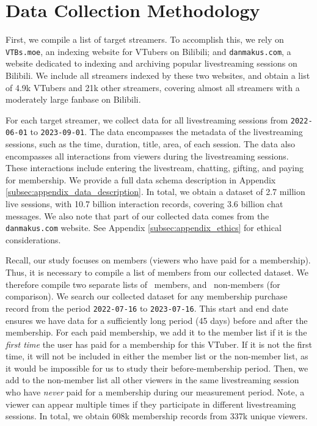 \vspace{-2ex}
\section{Data Collection Methodology}
\label{sec:dataset}



First, we compile a list of target streamers. 
To accomplish this, we rely on \texttt{VTBs.moe}, an indexing website for VTubers on Bilibili; and \texttt{danmakus.com}, a website dedicated to indexing and archiving popular livestreaming sessions on Bilibili.
We include all streamers indexed by these two websites, and obtain a list of 4.9k VTubers and 21k other streamers, covering almost all streamers with a moderately large fanbase on Bilibili. 


For each target streamer, we collect data for all livestreaming sessions from \texttt{2022-06-01} to \texttt{2023-09-01}. The data encompasses the metadata of the livestreaming sessions, such as the time, duration, title, area, \etc of each session.  The data also encompasses all interactions from viewers during the livestreaming sessions. These interactions include entering the livestream, chatting, gifting, and paying for membership. We provide a full data schema description in Appendix \ref{subsec:appendix_data_description}.
In total, we obtain a dataset of 2.7 million live sessions, with 10.7 billion interaction records, covering 3.6 billion chat messages. We also note that part of our collected data comes from the \texttt{danmakus.com} website.
See Appendix \ref{subsec:appendix_ethics} for ethical considerations.

\label{subsec:construct_dataset}
Recall, our study focuses on members (\ie viewers who have paid for a membership). 
Thus, it is necessary to compile a list of members from our collected dataset.
We therefore compile two separate lists of \one~members, and \two~non-members (for comparison). 
We search our collected dataset for any membership purchase record from the period \texttt{2022-07-16} to \texttt{2023-07-16}. This start and end date ensures we have data for a sufficiently long period (45 days) before and after the membership.
For each paid membership, we add it to the member list if it is the \emph{first time} the user has paid for a membership for this VTuber. If it is not the first time, it will not be included in either the member list or the non-member list, as it would be impossible for us to study their before-membership period. 
Then, we add to the non-member list all other viewers in the same livestreaming session who have \emph{never} paid for a membership during our measurement period. 
Note, a viewer can appear multiple times if they participate in different livestreaming sessions. In total, we obtain 608k membership records from 337k unique viewers. 



